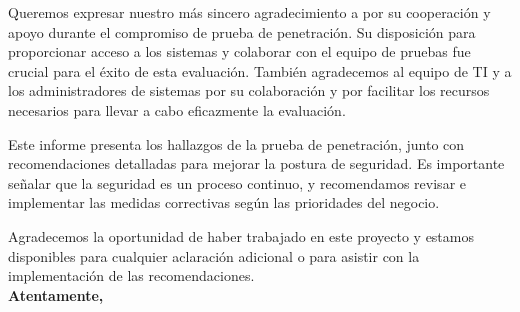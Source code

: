 {
\qquad Queremos expresar nuestro más sincero agradecimiento a \enterpriseName por su cooperación y apoyo durante el compromiso de prueba de penetración. Su disposición para proporcionar acceso a los sistemas y colaborar con el equipo de pruebas fue crucial para el éxito de esta evaluación. También agradecemos al equipo de TI y a los administradores de sistemas por su colaboración y por facilitar los recursos necesarios para llevar a cabo eficazmente la evaluación.

Este informe presenta los hallazgos de la prueba de penetración, junto con recomendaciones detalladas para mejorar la postura de seguridad. Es importante señalar que la seguridad es un proceso continuo, y recomendamos revisar e implementar las medidas correctivas según las prioridades del negocio.

Agradecemos la oportunidad de haber trabajado en este proyecto y estamos disponibles para cualquier aclaración adicional o para asistir con la implementación de las recomendaciones.
\\

\noindent \textbf{Atentamente,} \\
\brandName \\
\positiones \\
\myName  \\
}

